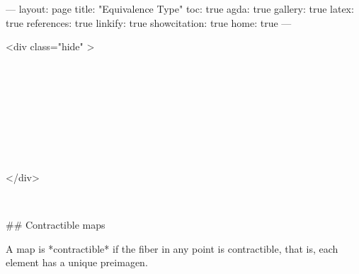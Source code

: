 ---
layout: page
title: "Equivalence Type"
toc: true
agda: true
gallery: true
latex: true
references: true
linkify: true
showcitation: true
home: true
---

<div class="hide" >
\begin{code}%
\>[0]\AgdaSymbol{\{-\#}\AgdaSpace{}%
\AgdaSpace{}%
\AgdaSpace{}%
\AgdaSymbol{\#-\}}\<%
\\
\>[0]\AgdaSpace{}%
\AgdaSpace{}%
\<%
\\
\>[0]\AgdaSpace{}%
\AgdaSpace{}%
\<%
\\
\>[0]\AgdaSpace{}%
\AgdaSpace{}%
\<%
\\
%
\\[\AgdaEmptyExtraSkip]%
\>[0]\AgdaSpace{}%
\AgdaSpace{}%
\<%
\\
\>[0]\AgdaSpace{}%
\AgdaSpace{}%
\<%
\\
\>[0]\<%
\end{code}
</div>

\begin{code}%
\>[0]\AgdaSpace{}%
\AgdaSpace{}%
\<%
\\
\>[0]\<%
\end{code}

## Contractible maps

A map is *contractible* if the fiber in any point is contractible, that is, each
element has a unique preimagen.


